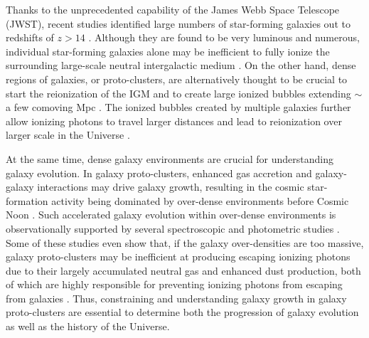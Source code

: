 \documentclass[twocolumn]{aastex631}
\begin{document}
Thanks to the unprecedented capability of the James Webb Space Telescope (JWST), recent studies identified large numbers of star-forming galaxies out to redshifts of $z>14$ \citep[][]{Castellano2022,Finkelstein2022,Naidu2022,Bunker2023,Carniani2024,Curtis-Lake2023,Donnan2023,Harikane2023,Carniani2024b,Roberts-Borsani2024,Hainline2024,Hsiao2023,Hsiao2024,Witstok2024a,Schouws2024,Wang2024}. Although they are found to be very luminous and numerous, individual star-forming galaxies alone may be inefficient to fully ionize the surrounding large-scale neutral intergalactic medium \citep[IGM; e.g.,][]{Dayal2009,Larson2022}.
On the other hand, dense regions of galaxies, or proto-clusters, are alternatively thought to be crucial to start the reionization of the IGM and to create large ionized bubbles extending $\sim$ a few comoving Mpc \citep[e.g.,][]{McQuinn2016}. The ionized bubbles created by multiple galaxies further allow ionizing photons to travel larger distances and lead to reionization over larger scale in the Universe \citep[e.g.,][]{Tilvi2020,Endsley2021, Leonova2022,Jin2024,Saxena2023,Witstok2024b,Witstok2024a,Whitler2024,Witstok2025}.

At the same time, dense galaxy environments are crucial for understanding galaxy evolution. In galaxy proto-clusters, enhanced gas accretion and galaxy-galaxy interactions may drive galaxy growth, resulting in the cosmic star-formation activity being dominated by over-dense environments before Cosmic Noon \citep{Chiang2017,Lim2024}.
Such accelerated galaxy evolution within over-dense environments is observationally supported by several spectroscopic and photometric studies \citep{Toshikawa2014,Higuchi2019,Harikane2019,Jin2023,Hashimoto2023,Champagne2024a,Helton2024,Morishita2024}.
Some of these studies even show that, if the galaxy over-densities are too massive, galaxy proto-clusters may be inefficient at producing escaping ionizing photons due to their largely accumulated neutral gas and enhanced dust production, both of which are highly responsible for preventing ionizing photons from escaping from galaxies \citep[][]{Hashimoto2023,Ma2024}.
Thus, constraining and understanding galaxy growth in galaxy proto-clusters are essential to determine both the progression of galaxy evolution as well as the history of the Universe.


\end{document}
